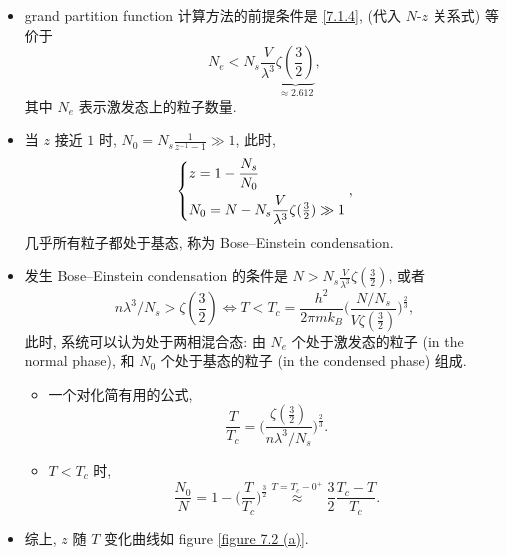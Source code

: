 \begin{itemize}
	\item grand partition function 计算方法的前提条件是 \eqref{7.1.4}, (代入 $N$-$z$ 关系式) 等价于
	\begin{equation}
		N_e < N_s \frac{V}{\lambda^3} \underbrace{\zeta({\textstyle \frac{3}{2}})}_{\approx 2.612},
	\end{equation} 
	其中 $N_e$ 表示激发态上的粒子数量.
	
	\item 当 $z$ 接近 $1$ 时, $N_0 = N_s \frac{1}{z^{- 1} - 1} \gg 1$, 此时,
	\begin{equation}
		\begin{dcases}
			z = 1 - \frac{N_s}{N_0} \\
			N_0 = N - N_s \frac{V}{\lambda^3} \zeta({\textstyle \frac{3}{2}}) \gg 1
		\end{dcases},
	\end{equation}
	几乎所有粒子都处于基态, 称为 Bose--Einstein condensation.
	
	\item 发生 Bose--Einstein condensation 的条件是 $N > N_s \frac{V}{\lambda^3} \zeta(\frac{3}{2})$, 或者
	\begin{equation}
		n \lambda^3 / N_s > \zeta({\textstyle \frac{3}{2}}) \iff T < T_c = \frac{h^2}{2 \pi m k_B} \Big( \frac{N / N_s}{V \zeta(\frac{3}{2})} \Big)^{\frac{2}{3}},
	\end{equation}
	此时, 系统可以认为处于两相混合态: 由 $N_e$ 个处于激发态的粒子 (in the normal phase), 和 $N_0$ 个处于基态的粒子 (in the condensed phase) 组成.
	\begin{itemize}
		\item 一个对化简有用的公式,
		\begin{equation}
			\frac{T}{T_c} = \Big( \frac{\zeta(\frac{3}{2})}{n \lambda^3 / N_s} \Big)^{\frac{2}{3}}.
		\end{equation}
		
		\item $T < T_c$ 时,
		\begin{equation}
			\frac{N_0}{N} = 1 - \Big( \frac{T}{T_c} \Big)^{\frac{3}{2}} \overset{T = T_c - 0^+}{\approx} \frac{3}{2} \frac{T_c - T}{T_c}.
		\end{equation}
	\end{itemize}
	
	\item 综上, $z$ 随 $T$ 变化曲线如 figure \ref{figure 7.2 (a)}.
	

\end{itemize}
